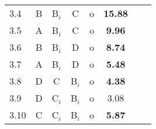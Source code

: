 \documentclass[12pt,letterpaper]{article}
\begin{document}
\begin{table}
\begin{center}
\begin{tabular*}{0.5\textwidth}{@{\extracolsep{\fill}}lccccccc}
3.4          & B      & B$_i$    & C        & o       &\bf15.88\\
3.5          & A      & B$_i$    & C        & o       &\bf9.96\\
3.6          & B      & B$_i$    & D        & o       &\bf8.74\\
3.7          & A      & B$_i$    & D        & o       &\bf5.48\\
3.8          & D      & C        & B$_i$    & o       &\bf4.38\\
3.9          & D      & C$_i$    & B$_i$    & o       &3.08\\
3.10         & C      & C$_i$    & B$_i$    & o       &\bf5.87\\
\hline
\hline
\end{tabular*}
\end{center}
\end{table}

\clearpage
\newpage
\end{document}
